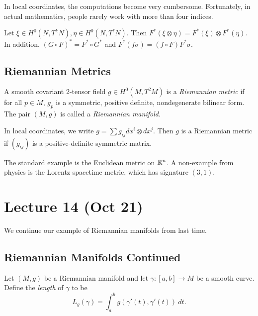 \documentclass[twoside, 10pt]{article}
\begin{document}
    In local coordinates, the computations become very cumbersome. Fortunately,
    in actual mathematics, people rarely work with more than four indices.

    \begin{prop} Let $\xi \in H^0(N,T^kN), \eta \in H^0(N,T^{\ell}N)$. Then
    $F^*(\xi \otimes \eta) = F^*(\xi) \otimes F^*(\eta)$. In addition, $(G
\circ F)^* = F^* \circ G^*$ and $F^*(f\sigma) = (f \circ F)F^*\sigma$.
\end{prop}
        

    \subsection{Riemannian Metrics}%

    \begin{defn} A smooth covariant $2$-tensor field $g \in H^0(M,T^2M)$ is a
        \textit{Riemannian metric} if for all $p \in M$, $g_p$ is a symmetric,
        positive definite, nondegenerate bilinear form. The pair $(M,g)$ is
        called a \textit{Riemannian manifold}.  \end{defn}
    
    In local coordinates, we write $g = \sum g_{ij} dx^i \otimes dx^j$. Then
    $g$ is a Riemannian metric if $(g_{ij})$ is a positive-definite symmetric
    matrix.

    \begin{exm} The standard example is the Euclidean metric on $\mathbb{R}^n$. A
    non-example from physics is the Lorentz spacetime metric, which has
signature $(3,1)$.  \end{exm}

    \section{Lecture 14 (Oct 21)}%
    
    We continue our example of Riemannian manifolds from last time.

    \subsection{Riemannian Manifolds Continued}%
    \label{sec:riemannian_geometry_continued}
    
    \begin{defn} Let $(M,g)$ be a Riemannian manifold and let $\gamma:[a,b] \to
        M$ be a smooth curve. Define the \textit{length} of $\gamma$ to be \[
        L_g(\gamma) = \int_a^b g(\gamma'(t),\gamma'(t))\ dt. \] \end{defn}
\end{document}
